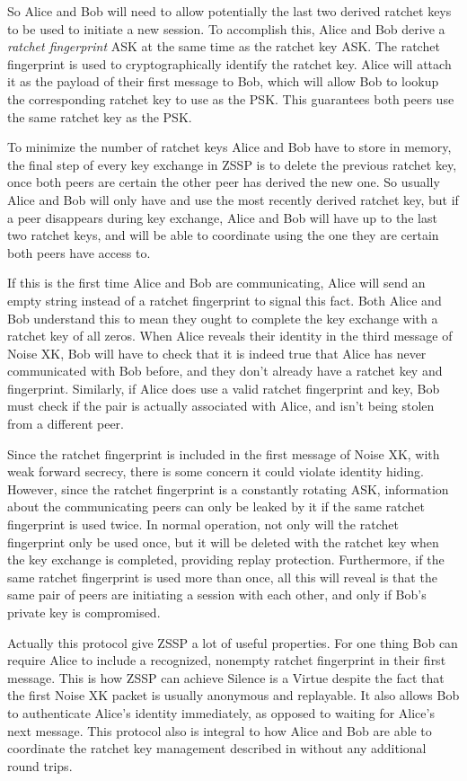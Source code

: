 \documentclass{article}
\begin{document}
So Alice and Bob will need to allow potentially the last two derived ratchet keys to be used to initiate a new session. To accomplish this, Alice and Bob derive a \emph{ratchet fingerprint} ASK at the same time as the ratchet key ASK. The ratchet fingerprint is used to cryptographically identify the ratchet key. Alice will attach it as the payload of their first message to Bob, which will allow Bob to lookup the corresponding ratchet key to use as the PSK. This guarantees both peers use the same ratchet key as the PSK.

To minimize the number of ratchet keys Alice and Bob have to store in memory, the final step of every key exchange in ZSSP is to delete the previous ratchet key, once both peers are certain the other peer has derived the new one. So usually Alice and Bob will only have and use the most recently derived ratchet key, but if a peer disappears during key exchange, Alice and Bob will have up to the last two ratchet keys, and will be able to coordinate using the one they are certain both peers have access to.

If this is the first time Alice and Bob are communicating, Alice will send an empty string instead of a ratchet fingerprint to signal this fact. Both Alice and Bob understand this to mean they ought to complete the key exchange with a ratchet key of all zeros. When Alice reveals their identity in the third message of Noise XK, Bob will have to check that it is indeed true that Alice has never communicated with Bob before, and they don't already have a ratchet key and fingerprint. Similarly, if Alice does use a valid ratchet fingerprint and key, Bob must check if the pair is actually associated with Alice, and isn't being stolen from a different peer.

Since the ratchet fingerprint is included in the first message of Noise XK, with weak forward secrecy, there is some concern it could violate identity hiding. However, since the ratchet fingerprint is a constantly rotating ASK, information about the communicating peers can only be leaked by it if the same ratchet fingerprint is used twice. In normal operation, not only will the ratchet fingerprint only be used once, but it will be deleted with the ratchet key when the key exchange is completed, providing replay protection. Furthermore, if the same ratchet fingerprint is used more than once, all this will reveal is that the same pair of peers are initiating a session with each other, and only if Bob's private key is compromised.

Actually this protocol give ZSSP a lot of useful properties. For one thing Bob can require Alice to include a recognized, nonempty ratchet fingerprint in their first message. This is how ZSSP can achieve Silence is a Virtue despite the fact that the first Noise XK packet is usually anonymous and replayable. It also allows Bob to authenticate Alice's identity immediately, as opposed to waiting for Alice's next message. This protocol also is integral to how Alice and Bob are able to coordinate the ratchet key management described in  without any additional round trips.
\end{document}
